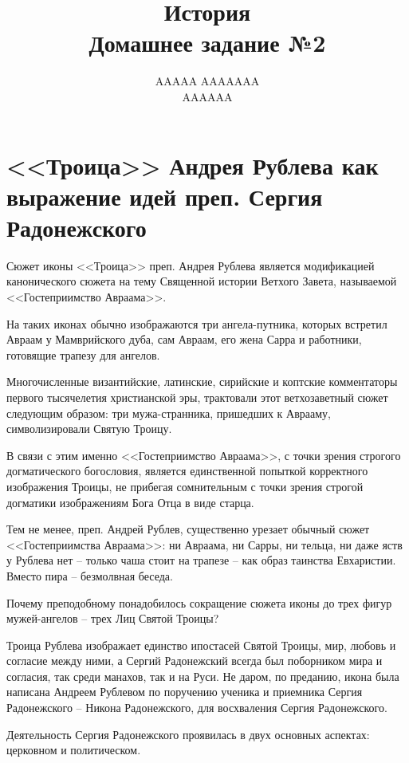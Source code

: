 \documentclass[12pt]{article}
\title{История \\ Домашнее задание №2}
\author{AAAAA AAAAAAA \\ AAAAAA}
\begin{document}
  \maketitle

  \setcounter{section}{2}
  \section{<<Троица>> Андрея Рублева как выражение идей преп. Сергия Радонежского}
  Сюжет иконы <<Троица>> преп. Андрея Рублева является модификацией канонического сюжета на тему Священной истории Ветхого Завета,
  называемой <<Гостеприимство Авраама>>.

  На таких иконах обычно изображаются три ангела-путника,
  которых встретил Авраам у Мамврийского дуба, сам Авраам, его жена Сарра
  и работники, готовящие трапезу для ангелов.

  Многочисленные византийские, латинские, сирийские и коптские комментаторы первого тысячелетия христианской эры,
  трактовали этот ветхозаветный сюжет следующим образом:
  три мужа-странника, пришедших к Аврааму, символизировали Святую Троицу.

  В связи с этим именно <<Гостеприимство Авраама>>, с точки зрения строгого догматического богословия,
  является единственной попыткой корректного изображения Троицы,
  не прибегая сомнительным с точки зрения строгой догматики изображениям Бога Отца в виде старца.

  Тем не менее, преп. Андрей Рублев, существенно урезает обычный сюжет <<Гостеприимства Авраама>>:
  ни Авраама, ни Сарры, ни тельца, ни даже яств у Рублева нет -- только чаша стоит на трапезе -- как образ таинства Евхаристии.
  Вместо пира -- безмолвная беседа.

  Почему преподобному понадобилось сокращение сюжета иконы до трех фигур мужей-ангелов -- трех Лиц Святой Троицы?

  Троица Рублева изображает единство ипостасей Святой Троицы, мир, любовь и согласие между ними,
  а Сергий Радонежский всегда был поборником мира и согласия, так среди манахов, так и на Руси.
  Не даром, по преданию, икона была написана Андреем Рублевом по поручению ученика и приемника Сергия Радонежского -- Никона Радонежского,
  для восхваления Сергия Радонежского.

  Деятельность Сергия Радонежского проявилась в двух основных аспектах: церковном и политическом.
\end{document}

